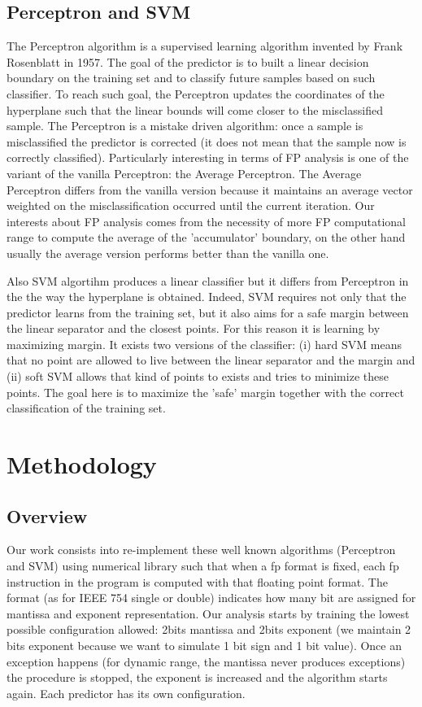 \documentclass[sigplan,review,anonymous=false]{acmart}\settopmatter{printfolios=true,printccs=false,printacmref=false}
\begin{document}
\subsection{Perceptron and SVM}
The Perceptron algorithm is a supervised learning algorithm invented by Frank Rosenblatt in 1957\cite{perceptron}. The goal of the predictor is to built a  linear decision boundary on the training set and to classify future samples based on such classifier. To reach such goal, the Perceptron updates the coordinates of the hyperplane such that the linear bounds will come closer to the misclassified sample. 
The Perceptron is a mistake driven algorithm: once a sample is misclassified the predictor is corrected (it does not mean that the sample now is correctly classified).
Particularly interesting in terms of FP analysis is one of the variant of the vanilla Perceptron: the Average Perceptron. 
The Average Perceptron differs from the vanilla version because it maintains an average vector weighted on the misclassification occurred until the current iteration. 
Our interests about FP analysis comes from the necessity of more FP computational range to compute the average of the 'accumulator' boundary, on the other hand usually the average version performs better than the vanilla one.

Also SVM algortihm produces a linear classifier but it differs from Perceptron in the the way the hyperplane is obtained. Indeed, SVM requires not only that the predictor learns from the training set, but it also aims for a safe margin between the linear separator and the closest points. For this reason it is learning by maximizing margin. It exists two versions of the classifier: (i) hard SVM means that no point are allowed to live between the linear separator and the margin and (ii) soft SVM allows that kind of points to exists and tries to minimize these points. The goal here is to maximize the 'safe' margin together with the correct classification of the training set.

\section{Methodology}
\subsection{Overview}
Our work consists into re-implement these well known algorithms (Perceptron and SVM) using numerical library\cite{MPFR}\cite{softfloat} such that when a fp format is fixed, each fp instruction in the program is computed with that floating point format. The format (as for IEEE 754 single or double) indicates how many bit are assigned for mantissa and exponent representation.
Our analysis starts by training the lowest possible configuration allowed: 2bits mantissa and 2bits exponent (we maintain 2 bits exponent because we want to simulate 1 bit sign and 1 bit value). 
Once an exception happens (for dynamic range, the mantissa never produces exceptions) the procedure is stopped, the exponent is increased and the algorithm starts again. Each predictor has its own configuration.  
\end{document}
